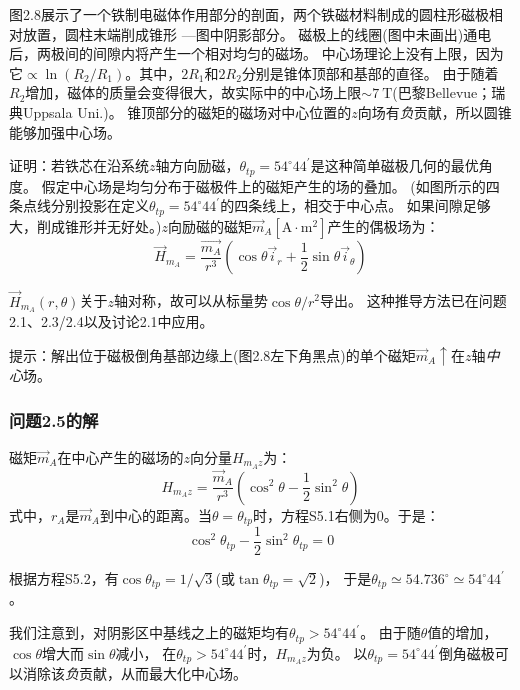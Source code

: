 图2.8展示了一个铁制电磁体作用部分的剖面，两个铁磁材料制成的圆柱形磁极相对放置，圆柱末端削成锥形
---图中阴影部分。
磁极上的线圈(图中未画出)通电后，两极间的间隙内将产生一个相对均匀的磁场。
中心场理论上没有上限，因为它$\propto \ln(R_2/R_1)$。其中，$2R_1$和$2R_2$分别是锥体顶部和基部的直径。
由于随着$R_2$增加，磁体的质量会变得很大，故实际中的中心场上限$\sim 7\ \mathrm{T}$(巴黎Bellevue；瑞典Uppsala Uni.)。
锥顶部分的磁矩的磁场对中心位置的$z$向场有\textit{负}贡献，所以圆锥能够加强中心场。

证明：若铁芯在沿系统$z$轴方向励磁，$\theta_{tp}=54^\circ 44^\prime$是这种简单磁极几何的最优角度。
假定中心场是均匀分布于磁极件上的磁矩产生的场的叠加。
(如图所示的四条点线分别投影在定义$\theta_{tp}=54^\circ 44^\prime$的四条线上，相交于中心点。
如果间隙足够大，削成锥形并无好处。)$z$向励磁的磁矩$\vec{m}_A [\mathrm{A\cdot m^2}]$产生的偶极场为：
\begin{equation}
\vec{H}_{m_A}=\frac{\vec{m_A}}{r^3}(\cos\theta \vec{i}_r+\frac{1}{2}\sin\theta\vec{i}_\theta)
\end{equation}

$\vec{H}_{m_A}(r,\theta)$关于$z$轴对称，故可以从标量势$\cos\theta/r^2$导出。
这种推导方法已在问题2.1、2.3/2.4以及讨论2.1中应用。

提示：解出位于磁极倒角基部边缘上(图2.8左下角黑点)的单个磁矩$\vec{m}_A \uparrow$在$z$轴\textit{中心}场。

\subsubsection*{问题2.5的解}
磁矩$\vec{m}_A$在中心产生的磁场的$z$向分量$H_{m_A z}$为：
\begin{equation*}
H_{m_A z}=\frac{\vec{m}_A}{r^3}(\cos^2\theta-\frac{1}{2}\sin^2\theta) \tag{S5.1}
\end{equation*}
式中，$r_A$是$\vec{m}_A$到中心的距离。当$\theta=\theta_{tp}$时，方程S5.1右侧为0。于是：
\begin{equation*}
\cos^2\theta_{tp}-\frac{1}{2}\sin^2\theta_{tp}=0 \tag{S5.2}
\end{equation*}

根据方程S5.2，有$\cos\theta_{tp}=1/\sqrt{3}$(或$\tan\theta_{tp}=\sqrt{2}$)，
于是$\theta_{tp}\simeq 54.736^\circ\simeq54^\circ 44^\prime$。

我们注意到，对阴影区中基线之上的磁矩均有$\theta_{tp}>54^\circ 44^\prime$。
由于随$\theta$值的增加，$\cos\theta$增大而$\sin\theta$减小，
在$\theta_{tp}>54^\circ 44^\prime$时，$H_{m_A z}$为负。
以$\theta_{tp}=54^\circ 44^\prime$倒角磁极可以消除该\textit{负}贡献，从而最大化中心场。

